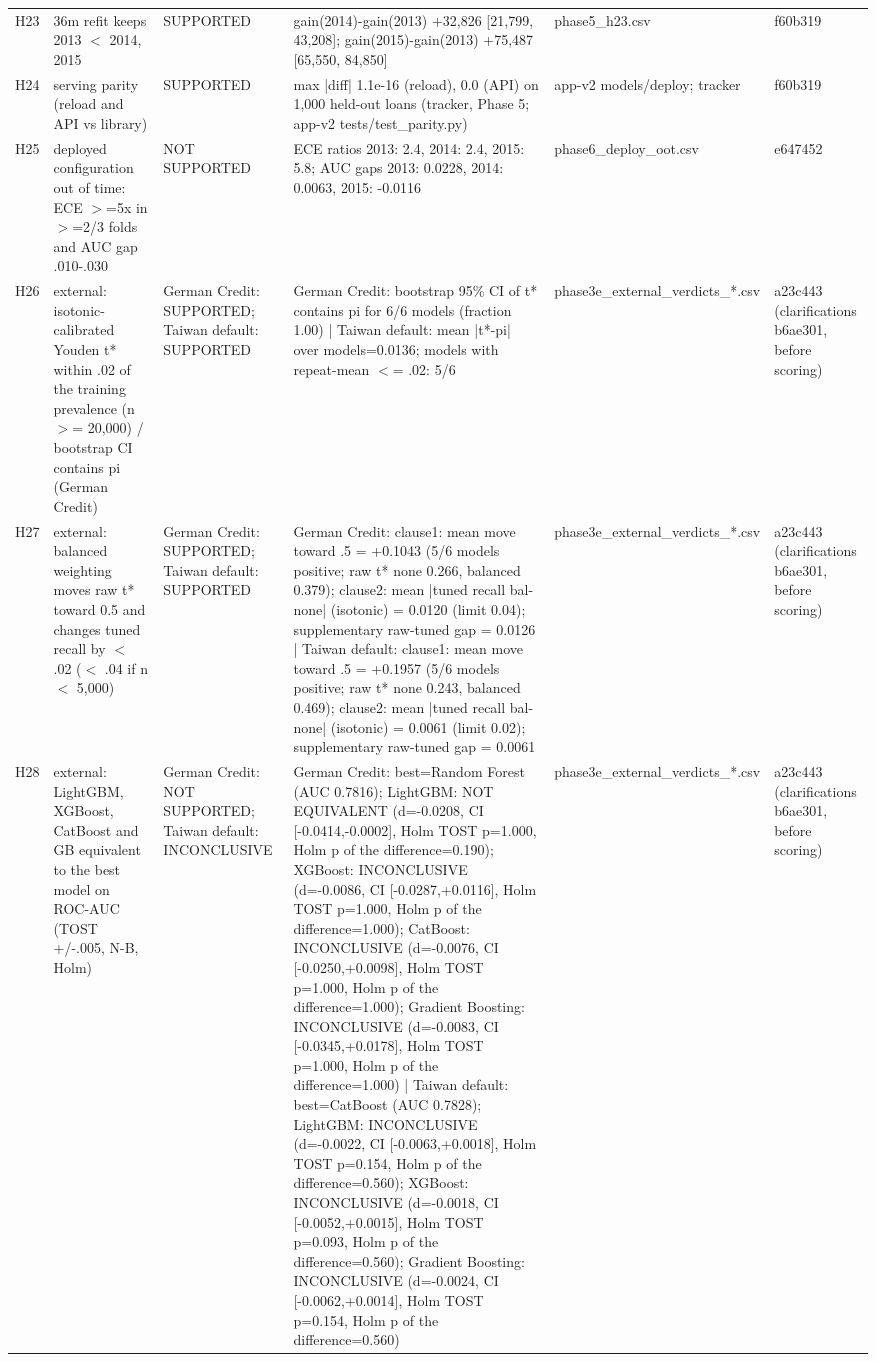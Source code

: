 \begin{tabular}{lp{5.2cm}p{5.2cm}p{5.2cm}lp{5.2cm}}
H23 & 36m refit keeps 2013 $<$ 2014, 2015 & SUPPORTED & gain(2014)-gain(2013) +32,826 [21,799, 43,208]; gain(2015)-gain(2013) +75,487 [65,550, 84,850] & phase5\_h23.csv & f60b319 \\
H24 & serving parity (reload and API vs library) & SUPPORTED & max |diff| 1.1e-16 (reload), 0.0 (API) on 1,000 held-out loans (tracker, Phase 5; app-v2 tests/test\_parity.py) & app-v2 models/deploy; tracker & f60b319 \\
H25 & deployed configuration out of time: ECE $>$=5x in $>$=2/3 folds and AUC gap .010-.030 & NOT SUPPORTED & ECE ratios 2013: 2.4, 2014: 2.4, 2015: 5.8; AUC gaps 2013: 0.0228, 2014: 0.0063, 2015: -0.0116 & phase6\_deploy\_oot.csv & e647452 \\
H26 & external: isotonic-calibrated Youden t* within .02 of the training prevalence (n $>$= 20,000) / bootstrap CI contains pi (German Credit) & German Credit: SUPPORTED; Taiwan default: SUPPORTED & German Credit: bootstrap 95\% CI of t* contains pi for 6/6 models (fraction 1.00) | Taiwan default: mean |t*-pi| over models=0.0136; models with repeat-mean $<$= .02: 5/6 & phase3e\_external\_verdicts\_*.csv & a23c443 (clarifications b6ae301, before scoring) \\
H27 & external: balanced weighting moves raw t* toward 0.5 and changes tuned recall by $<$ .02 ($<$ .04 if n $<$ 5,000) & German Credit: SUPPORTED; Taiwan default: SUPPORTED & German Credit: clause1: mean move toward .5 = +0.1043 (5/6 models positive; raw t* none 0.266, balanced 0.379); clause2: mean |tuned recall bal-none| (isotonic) = 0.0120 (limit 0.04); supplementary raw-tuned gap = 0.0126 | Taiwan default: clause1: mean move toward .5 = +0.1957 (5/6 models positive; raw t* none 0.243, balanced 0.469); clause2: mean |tuned recall bal-none| (isotonic) = 0.0061 (limit 0.02); supplementary raw-tuned gap = 0.0061 & phase3e\_external\_verdicts\_*.csv & a23c443 (clarifications b6ae301, before scoring) \\
H28 & external: LightGBM, XGBoost, CatBoost and GB equivalent to the best model on ROC-AUC (TOST +/-.005, N-B, Holm) & German Credit: NOT SUPPORTED; Taiwan default: INCONCLUSIVE & German Credit: best=Random Forest (AUC 0.7816); LightGBM: NOT EQUIVALENT (d=-0.0208, CI [-0.0414,-0.0002], Holm TOST p=1.000, Holm p of the difference=0.190); XGBoost: INCONCLUSIVE (d=-0.0086, CI [-0.0287,+0.0116], Holm TOST p=1.000, Holm p of the difference=1.000); CatBoost: INCONCLUSIVE (d=-0.0076, CI [-0.0250,+0.0098], Holm TOST p=1.000, Holm p of the difference=1.000); Gradient Boosting: INCONCLUSIVE (d=-0.0083, CI [-0.0345,+0.0178], Holm TOST p=1.000, Holm p of the difference=1.000) | Taiwan default: best=CatBoost (AUC 0.7828); LightGBM: INCONCLUSIVE (d=-0.0022, CI [-0.0063,+0.0018], Holm TOST p=0.154, Holm p of the difference=0.560); XGBoost: INCONCLUSIVE (d=-0.0018, CI [-0.0052,+0.0015], Holm TOST p=0.093, Holm p of the difference=0.560); Gradient Boosting: INCONCLUSIVE (d=-0.0024, CI [-0.0062,+0.0014], Holm TOST p=0.154, Holm p of the difference=0.560) & phase3e\_external\_verdicts\_*.csv & a23c443 (clarifications b6ae301, before scoring) \\
\bottomrule
\end{tabular}
